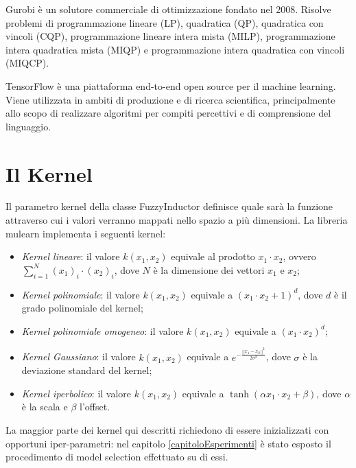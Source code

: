 \documentclass[12pt,a4paper]{report}
\begin{document}
Gurobi\cite{gurobi} è un solutore commerciale di ottimizzazione fondato nel 2008. Risolve problemi di programmazione lineare (LP), quadratica (QP), quadratica con vincoli (CQP), programmazione lineare intera mista (MILP), programmazione intera quadratica mista (MIQP) e programmazione intera quadratica con vincoli (MIQCP).

TensorFlow\cite{tensorFlow} è una piattaforma end-to-end open source per il machine learning. Viene utilizzata in ambiti di produzione e di ricerca scientifica, principalmente allo scopo di realizzare algoritmi per compiti percettivi e di comprensione del linguaggio.

\section{Il Kernel}\label{kernelSection}
Il parametro kernel della classe FuzzyInductor definisce quale sarà la funzione attraverso cui i valori verranno mappati nello spazio a più dimensioni.
La libreria mulearn implementa i seguenti kernel:

\begin{itemize}
\item \emph{Kernel lineare}: il valore $k(x_1,x_2)$ equivale al prodotto $x_1\cdot x_2$, ovvero  $\sum_{i=1}^N(x_1)_i\cdot(x_2)_i$, dove $N$ è la dimensione dei vettori $x_1$ e $x_2$;
\item \emph{Kernel polinomiale}: il valore $k(x_1,x_2)$ equivale a $(x_1\cdot x_2 + 1)^d$, dove $d$ è il grado polinomiale del kernel;
\item \emph{Kernel polinomiale omogeneo}:  il valore  $k(x_1,x_2)$ equivale a $(x_1\cdot x_2)^d$;
\item \emph{Kernel Gaussiano}:   il valore  $k(x_1,x_2)$ equivale a $e^{-\frac{||x_1 - x_2||^2}{2 \sigma^2}}$, dove $\sigma$ è la deviazione standard del kernel;
\item \emph{Kernel iperbolico}:   il valore $k(x_1,x_2)$  equivale a $\tanh(\alpha x_1 \cdot x_2 + \beta)$, dove $\alpha$ è la scala e $\beta$ l'offset.
\end{itemize}

La maggior parte dei kernel qui descritti richiedono di essere inizializzati con opportuni iper-parametri: nel capitolo \ref{capitoloEsperimenti} è stato esposto il procedimento di model selection effettuato su di essi.
\end{document}
